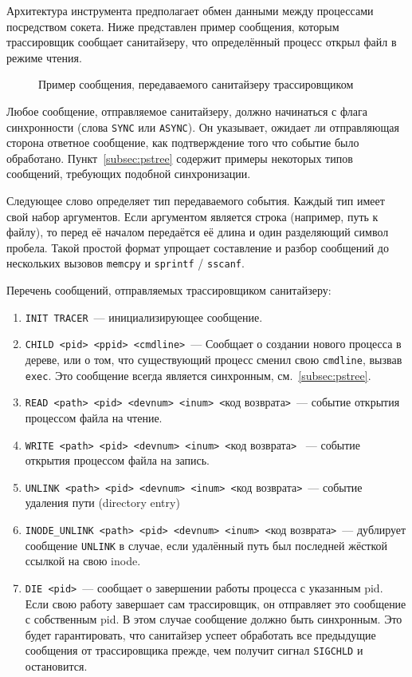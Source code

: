 Архитектура инструмента предполагает обмен данными между процессами посредством сокета. Ниже представлен пример сообщения, которым трассировщик сообщает санитайзеру, что определённый процесс открыл файл в режиме чтения.

\begin{figure}[H]
    \centering
    
    \caption{Пример сообщения, передаваемого санитайзеру трассировщиком}
    \label{fig:parmasan-message-example}
\end{figure}

Любое сообщение, отправляемое санитайзеру, должно начинаться с флага синхронности (слова \texttt{SYNC} или \texttt{ASYNC}). Он указывает, ожидает ли отправляющая сторона ответное сообщение, как подтверждение того что событие было обработано. Пункт~\ref{subsec:pstree} содержит примеры некоторых типов сообщений, требующих подобной синхронизации.

Следующее слово определяет тип передаваемого события. Каждый тип имеет свой набор аргументов. Если аргументом является строка (например, путь к файлу), то перед её началом передаётся её длина и один разделяющий символ пробела. Такой простой формат упрощает составление и разбор сообщений до нескольких вызовов \texttt{memcpy} и \texttt{sprintf} / \texttt{sscanf}.

Перечень сообщений, отправляемых трассировщиком санитайзеру:

\begin{enumerate}
    \item \texttt{INIT TRACER}~--- инициализирующее сообщение.
    \item \texttt{CHILD <pid> <ppid> <cmdline>}~--- Сообщает о создании нового процесса в дереве, или о том, что существующий процесс сменил свою \texttt{cmdline}, вызвав \texttt{exec}. Это сообщение всегда является синхронным, см.~\ref{subsec:pstree}.
    \item \texttt{READ <path> <pid> <devnum> <inum> <}код возврата\texttt{>}~--- событие открытия процессом файла на чтение.
    \item \texttt{WRITE <path> <pid> <devnum> <inum> <}код возврата\texttt{>}
    ~--- событие открытия процессом файла на запись.
    \item \texttt{UNLINK <path> <pid> <devnum> <inum> <}код возврата\texttt{>}~--- событие удаления пути (directory entry)
    \item \texttt{INODE\_UNLINK <path> <pid> <devnum> <inum> <}код возврата\texttt{>}~--- дублирует сообщение \texttt{UNLINK} в случае, если удалённый путь был последней жёсткой ссылкой на свою inode.
    \item \texttt{DIE <pid>}~--- сообщает о завершении работы процесса с указанным pid. Если свою работу завершает сам трассировщик, он отправляет это сообщение с собственным pid. В этом случае сообщение должно быть синхронным. Это будет гарантировать, что санитайзер успеет обработать все предыдущие сообщения от трассировщика прежде, чем получит сигнал \texttt{SIGCHLD} и остановится.
\end{enumerate}

